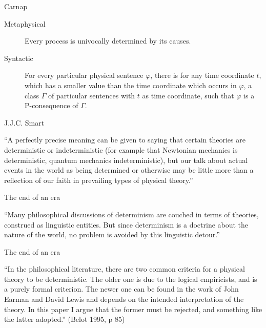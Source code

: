 \documentclass[fleqn]{beamer}
\begin{document}
\begin{frame}{Carnap}

  \begin{description}
  \item[Metaphysical] Every process is univocally determined by its
    causes.
  \item[Syntactic] For every particular physical sentence $\varphi$,
    there is for any time coordinate $t$, which has a smaller value
    than the time coordinate which occurs in $\varphi$, a class
    $\Gamma$ of particular sentences with $t$ as time coordinate, such
    that $\varphi$ is a P-consequence of $\Gamma$. \end{description}


  \end{frame}

\begin{frame}{J.J.C. Smart}

  ``A perfectly precise meaning can be given to saying that certain
  theories are deterministic or indeterministic (for example that
  Newtonian mechanics is deterministic, quantum mechanics
  indeterministic), but our talk about actual events in the world as
  being determined or otherwise may be little more than a reflection
  of our faith in prevailing types of physical theory.'' \citep[p
  294]{smart-free}

\end{frame}

\begin{frame}{The end of an era}

  ``Many philosophical discussions of determinism are couched in terms
  of theories, construed as linguistic entities. But since determinism
  is a doctrine about the nature of the world, no problem is avoided
  by this linguistic detour.'' \citep[20]{primer}


\end{frame}

\begin{frame}{The end of an era}

  ``In the philosophical literature, there are two common criteria for
  a physical theory to be deterministic. The older one is due to the
  logical empiricists, and is a purely formal criterion. The newer one
  can be found in the work of John Earman and David Lewis and depends
  on the intended interpretation of the theory. In this paper I argue
  that the former must be rejected, and something like the latter
  adopted.'' (Belot 1995, p 85)

\end{frame}  
\end{document}
